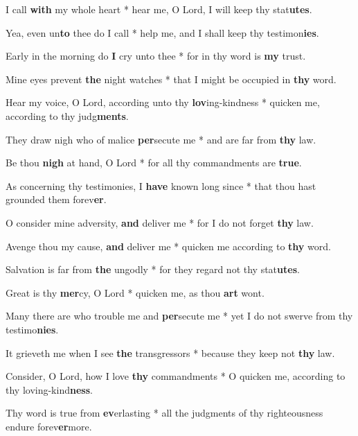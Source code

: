 \begin{multicols}{2}
	I call \textbf{with} my whole heart * hear me, O Lord, I will keep thy stat\textbf{utes}.
	
	Yea, even un\textbf{to} thee do I call * help me, and I shall keep thy testimon\textbf{ies}.
	
	Early in the morning do \textbf{I} cry unto thee * for in thy word is \textbf{my} trust.
	
	Mine eyes prevent \textbf{the} night watches * that I might be occupied in \textbf{thy} word.
	
	Hear my voice, O Lord, according unto thy \textbf{lov}ing-kindness * quicken me, according to thy judg\textbf{ments}.
	
	They draw nigh who of malice \textbf{per}secute me * and are far from \textbf{thy} law.
	
	Be thou \textbf{nigh} at hand, O Lord * for all thy commandments are \textbf{true}.
	
	As concerning thy testimonies, I \textbf{have} known long since * that thou hast grounded them forev\textbf{er}.
	
	O consider mine adversity, \textbf{and} deliver me * for I do not forget \textbf{thy} law.
	
	Avenge thou my cause, \textbf{and} deliver me * quicken me according to \textbf{thy} word.
	
	Salvation is far from \textbf{the} ungodly * for they regard not thy stat\textbf{utes}.
	
	Great is thy \textbf{mer}cy, O Lord * quicken me, as thou \textbf{art} wont.
	
	Many there are who trouble me and \textbf{per}secute me * yet I do not swerve from thy testimo\textbf{nies}.
	
	It grieveth me when I see \textbf{the} transgressors * because they keep not \textbf{thy} law.
	
	Consider, O Lord, how I love \textbf{thy} commandments * O quicken me, according to thy loving-kind\textbf{ness}.
	
	Thy word is true from \textbf{ev}erlasting * all the judgments of thy righteousness endure forev\textbf{er}more.
\end{multicols}